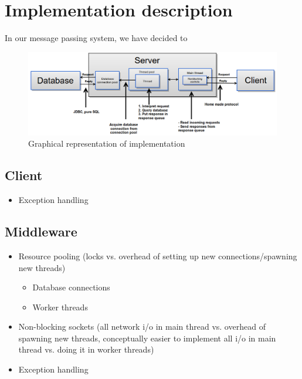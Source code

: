 \documentclass{article}
\begin{document}
    \maketitle
    \tableofcontents

    \section{Implementation description}
        In our message passing system, we have decided to 
         \begin{figure}[H]
            \hspace{-2.8cm}
             \includegraphics[scale=0.50]{implementation_high_level}
             \caption{Graphical representation of implementation}
             \label{fig:implementation_high_level}
         \end{figure}

        \subsection{Client}
            \begin{itemize}
                \item Exception handling
            \end{itemize}
        \subsection{Middleware}
            \begin{itemize}
                \item Resource pooling (locks vs. overhead of setting up new connections/spawning new threads)
                \begin{itemize}
                    \item Database connections
                    \item Worker threads
                \end{itemize}
                \item Non-blocking sockets (all network i/o in main thread vs. overhead of spawning new threads, conceptually easier to implement all i/o in main thread vs. doing it in worker threads)
                \item Exception handling
            \end{itemize}
\end{document}

